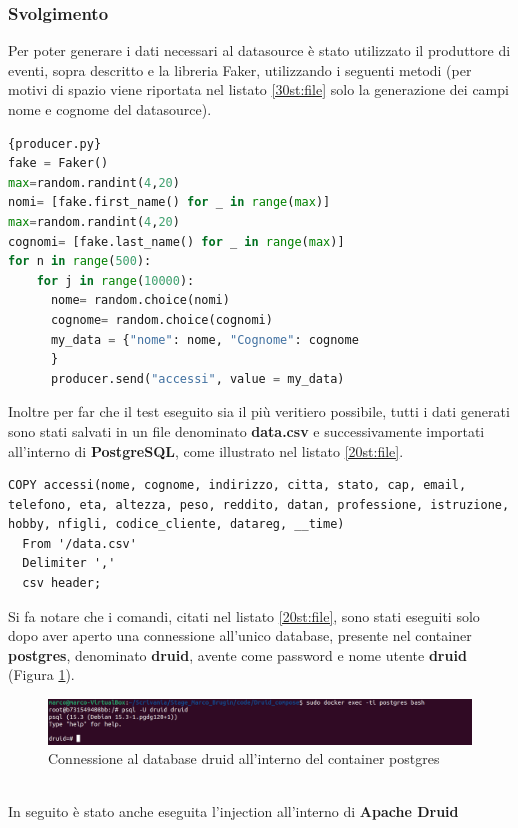 \subsubsection{Svolgimento}
Per poter generare i dati necessari al \gls{datasource}{} è stato utilizzato il produttore di eventi, sopra descritto e la libreria \gls{Faker}{}, utilizzando i seguenti metodi (per motivi di spazio viene riportata nel listato \ref{30st:file} solo la generazione 
dei campi nome e cognome del \gls{datasource}{}).
\pagebreak
\begin{lstlisting}[language=Python, caption=\texttt{producer.py}, label=30st:file]{producer.py}
fake = Faker()
max=random.randint(4,20)  
nomi= [fake.first_name() for _ in range(max)]
max=random.randint(4,20)
cognomi= [fake.last_name() for _ in range(max)]
for n in range(500):
    for j in range(10000):
      nome= random.choice(nomi)
      cognome= random.choice(cognomi)
      my_data = {"nome": nome, "Cognome": cognome
      }
      producer.send("accessi", value = my_data) 
\end{lstlisting}
Inoltre per far che il test eseguito sia il più veritiero possibile, tutti i dati generati 
sono stati salvati in un file denominato \textbf{data.csv} e successivamente importati all'interno di \textbf{PostgreSQL}, come illustrato nel listato \ref{20st:file}.
\begin{lstlisting}[label=20st:file ]
  COPY accessi(nome, cognome, indirizzo, citta, stato, cap, email, telefono, eta, altezza, peso, reddito, datan, professione, istruzione, hobby, nfigli, codice_cliente, datareg, __time)
  From '/data.csv'
  Delimiter ','
  csv header;
\end{lstlisting}
Si fa notare che i comandi, citati nel listato \ref{20st:file}, sono stati eseguiti solo dopo
aver aperto una connessione all'unico database, presente nel \gls{container}{} \textbf{postgres}, denominato \textbf{druid}, avente come password e nome utente \textbf{druid} (Figura \ref{fig:accesso_psql}).
\begin{figure}[h]
  \centering
  \includegraphics[width=1\textwidth]{images/percorso/accesso_psql.png}
  \caption{Connessione al database druid all'interno del container postgres}
  \label{fig:accesso_psql}
\end{figure}
\\
In seguito è stato anche eseguita l'\gls{injection}{} all'interno di \textbf{Apache Druid} 
